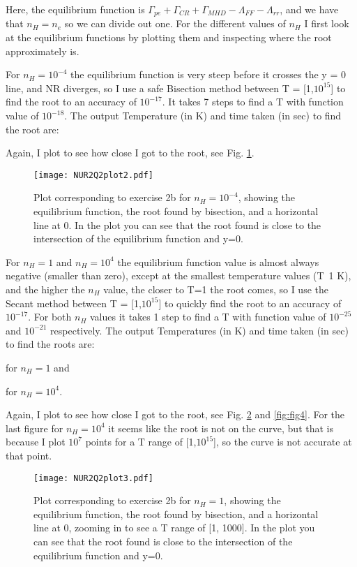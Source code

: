 Here, the equilibrium function is $\Gamma_{pe} + \Gamma_{CR} + \Gamma_{MHD} - \Lambda_{FF} - \Lambda_{rr}$, and we have that $n_H = n_e$ so we can divide out one. 
For the different values of $n_H$ I first look at the equilibrium functions by plotting them and inspecting where the root approximately is. 

For $n_H = 10^{-4}$ the equilibrium function is very steep before it crosses the y = 0 line, and NR diverges, so I use a safe Bisection method between T = [1,$10^{15}$] to find the root to an accuracy of $10^{-17}$. It takes 7 steps to find a T with function value of $10^{-18}$.
The output Temperature (in K) and time taken (in sec) to find the root are:


Again, I plot to see how close I got to the root, see Fig. \ref{fig:fig2}.

\begin{figure}[h!]
  \centering
  \texttt{[image: NUR2Q2plot2.pdf]}
  \caption{Plot corresponding to exercise 2b for $n_H = 10^{-4}$, showing the equilibrium function, the root found by bisection, and a horizontal line at 0. In the plot you can see that the root found is close to the intersection of the equilibrium function and y=0.}
  \label{fig:fig2}
\end{figure} 


For $n_H = 1$ and $n_H = 10^4$ the equilibrium function value is almost always negative (smaller than zero), except at the smallest temperature values (T~1 K), and the higher the $n_H$ value, the closer to T=1 the root comes, so I use the Secant method between T = [1,$10^{15}$] to quickly find the root to an accuracy of $10^{-17}$. 
For both $n_H$ values it takes 1 step to find a T with function value of $10^{-25}$ and $10^{-21}$ respectively.
The output Temperatures (in K) and time taken (in sec) to find the roots are:

for $n_H = 1$ and 

for $n_H = 10^4$.

Again, I plot to see how close I got to the root, see Fig. \ref{fig:fig3} and \ref{fig:fig4}. For the last figure for $n_H = 10^4$ it seems like the root is not on the curve, but that is because I plot $10^7$ points for a T range of [1,$10^{15}$], so the curve is not accurate at that point.


\begin{figure}[h!]
  \centering
  \texttt{[image: NUR2Q2plot3.pdf]}
  \caption{Plot corresponding to exercise 2b for $n_H = 1$, showing the equilibrium function, the root found by bisection, and a horizontal line at 0, zooming in to see a T range of [1, 1000]. In the plot you can see that the root found is close to the intersection of the equilibrium function and y=0.}
  \label{fig:fig3}
\end{figure} 


